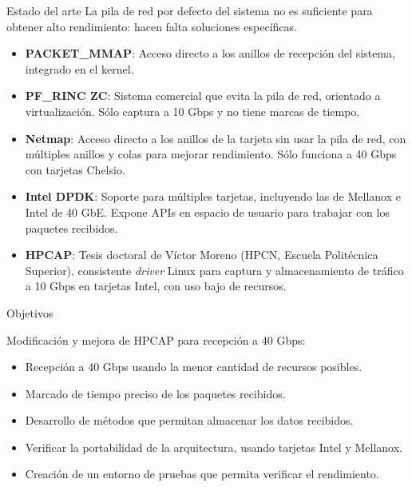 \documentclass[10pt,notes,compress,usetitleprogressbar,aspectratio=1610]{beamer}
\begin{document}
\begin{frame}{Estado del arte}
La pila de red por defecto del sistema no es suficiente para obtener alto rendimiento: hacen falta soluciones específicas.

\begin{itemize}
\item \textbf{PACKET\_MMAP}: Acceso directo a los anillos de recepción del sistema, integrado en el kernel. 
\item \textbf{PF\_RINC ZC}: Sistema comercial que evita la pila de red, orientado a virtualización. Sólo captura a 10 Gbps y no tiene marcas de tiempo.
\item \textbf{Netmap}: Acceso directo a los anillos de la tarjeta sin usar la pila de red, con múltiples anillos y colas para mejorar rendimiento. Sólo funciona a 40 Gbps con tarjetas Chelsio.
\item \textbf{Intel DPDK}: Soporte para múltiples tarjetas, incluyendo las de Mellanox e Intel de 40 GbE. Expone APIs en espacio de usuario para trabajar con los paquetes recibidos.
\item \textbf{HPCAP}: Tesis doctoral de Víctor Moreno (HPCN, Escuela Politécnica Superior), consistente \textit{driver} Linux para captura y almacenamiento de tráfico a 10 Gbps en tarjetas Intel, con uso bajo de recursos.
\end{itemize}
\end{frame}

\begin{frame}{Objetivos}

Modificación y mejora de HPCAP para recepción a 40 Gbps:

\begin{itemize}
\item Recepción a 40 Gbps usando la menor cantidad de recursos posibles.
\item Marcado de tiempo preciso de los paquetes recibidos.
\item Desarrollo de métodos que permitan almacenar los datos recibidos.
\item Verificar la portabilidad de la arquitectura, usando tarjetas Intel y Mellanox.
\item Creación de un entorno de pruebas que permita verificar el rendimiento.
\end{itemize}
\end{frame}
\end{document}
